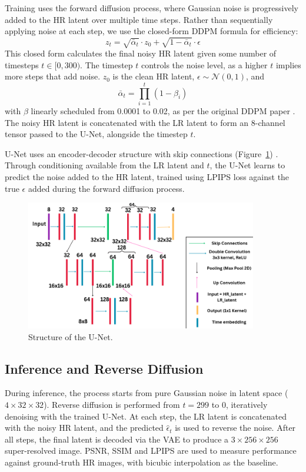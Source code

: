 \documentclass{article} %
\begin{document}
Training uses the forward diffusion process, where Gaussian noise is progressively added to the HR latent over multiple time steps. Rather than sequentially applying noise at each step, we use the closed-form DDPM formula for efficiency:
\[
z_t = \sqrt{\bar{\alpha}_t} \cdot z_0 + \sqrt{1 - \bar{\alpha}_t} \cdot \epsilon
\]
This closed form calculates the final noisy HR latent given some number of timesteps \( t \in [0, 300) \). The timestep \( t \) controls the noise level, as a higher \( t \) implies more steps that add noise. \( z_0 \) is the clean HR latent, \( \epsilon \sim \mathcal{N}(0, 1) \), and
\[
\bar{\alpha}_t = \prod_{i=1}^{t} (1 - \beta_i)
\]
with \( \beta \) linearly scheduled from 0.0001 to 0.02, as per the original DDPM paper \citep{ho20}. The noisy HR latent is concatenated with the LR latent to form an 8-channel tensor passed to the U-Net, alongside the timestep \( t \).

U-Net uses an encoder-decoder structure with skip connections (Figure~\ref{model3}) \citep{ronneberger2015unet}. Through conditioning available from the LR latent and \( t \), the U-Net learns to predict the noise added to the HR latent, trained using LPIPS loss against the true \( \epsilon \) added during the forward diffusion process.

\begin{figure}[h]
\begin{center}
\includegraphics[width=0.9\textwidth]{progress/Figs/model3.png}
\end{center}
\caption{Structure of the U-Net.}
\label{model3}
\end{figure}

\subsection{Inference and Reverse Diffusion}

During inference, the process starts from pure Gaussian noise in latent space (\(4 \times 32 \times 32\)). Reverse diffusion is performed from \( t = 299 \) to \( 0 \), iteratively denoising with the trained U-Net. At each step, the LR latent is concatenated with the noisy HR latent, and the predicted \( \hat{\epsilon}_t \) is used to reverse the noise. After all steps, the final latent is decoded via the VAE to produce a \(3 \times 256 \times 256\) super-resolved image. PSNR, SSIM and LPIPS are used to measure performance against ground-truth HR images, with bicubic interpolation as the baseline.
\end{document}
